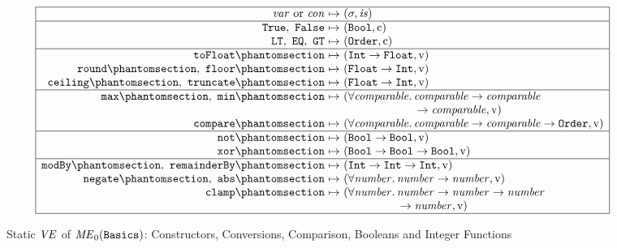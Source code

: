 \begin{figure}[htbp]
\centering
\small
\[
\begin{array}{|r@{\ }c@{\ }l|}
\hline
\var\ \text{or}\ \con & \mapsto & (\sigma, \is)\\
\hline
\kw{True}\citealso{b:Basics.Bool},\ \kw{False}\citealso{b:Basics.Bool} & \mapsto & (\tBool, \isc)\\
\kw{LT}\citealso{b:Basics.Order},\ \kw{EQ}\citealso{b:Basics.Order},\ \kw{GT}\citealso{b:Basics.Order} & \mapsto & (\sbtOrder, \isc)\\
\hline
\kw{toFloat}\citelabel{b:Basics.toFloat} & \mapsto & (\tInt \rightarrow \tFloat, \isv)\\
\kw{round}\citelabel{b:Basics.round},\ \kw{floor}\citelabel{b:Basics.floor} & \mapsto & (\tFloat \rightarrow \tInt, \isv)\\
\kw{ceiling}\citelabel{b:Basics.ceiling},\ \kw{truncate}\citelabel{b:Basics.truncate} & \mapsto & (\tFloat \rightarrow \tInt, \isv)\\
\hline
\kw{max}\citelabel{b:Basics.max},\ \kw{min}\citelabel{b:Basics.min} & \mapsto & (\forall\mv{comparable}.\,\mv{comparable} \rightarrow \mv{comparable}\\
 & & \phantom{(\forall\mv{comparable}.\,}{} \rightarrow \mv{comparable}, \isv)\\
\kw{compare}\citelabel{b:Basics.compare} & \mapsto & (\forall\mv{comparable}.\,\mv{comparable} \rightarrow \mv{comparable} \rightarrow \sbtOrder, \isv)\\
\hline
\kw{not}\citelabel{b:Basics.not} & \mapsto & (\tBool \rightarrow \tBool, \isv)\\
\kw{xor}\citelabel{b:Basics.xor} & \mapsto & (\tBool \rightarrow \tBool \rightarrow \tBool, \isv)\\
\hline
\kw{modBy}\citelabel{b:Basics.modBy},\ \kw{remainderBy}\citelabel{b:Basics.remainderBy} & \mapsto & (\tInt \rightarrow \tInt \rightarrow \tInt, \isv)\\
\kw{negate}\citelabel{b:Basics.negate},\ \kw{abs}\citelabel{b:Basics.abs} & \mapsto & (\forall\mv{number}.\,\mv{number} \rightarrow \mv{number}, \isv)\\
\kw{clamp}\citelabel{b:Basics.clamp} & \mapsto & (\forall\mv{number}.\,\mv{number} \rightarrow \mv{number} \rightarrow \mv{number}\\
 & & \phantom{(\forall\mv{number}.\,}{} \rightarrow \mv{number}, \isv)\\
\hline
\end{array}
\]
\caption{Static $\mathit{VE}$ of $\mathit{ME}_0(\textnormal{\texttt{Basics}})$: Constructors, Conversions,
Comparison, Booleans and Integer Functions}\label{fig:static-basis-basics-ve1}
\end{figure}

